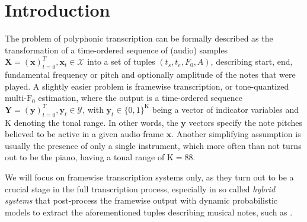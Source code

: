 \section{Introduction}
The problem of polyphonic transcription can be formally described as the transformation of a time-ordered sequence of (audio) samples $\mathbf{X} = (\mathbf{x})_{t=0}^{T}, \mathbf{x}_t \in \mathcal{X}$ into a set of tuples $(t_{s}, t_{e}, F_0, A)$, describing start, end, fundamental frequency or pitch and optionally amplitude of the notes that were played. A slightly easier problem is framewise transcription, or tone-quantized multi-$\mathrm{F}_0$ estimation, where the output is a time-ordered sequence $\mathbf{Y} = (\mathbf{y})_{t=0}^{T}, \mathbf{y}_t \in \mathcal{Y}$, with $\mathbf{y}_t \in \{0, 1\}^{\mathrm{K}}$ being a vector of indicator variables and $\mathrm{K}$ denoting the tonal range. In other words, the $\mathbf{y}$ vectors specify the note pitches believed to be active in a given audio frame $\mathbf{x}$. Another simplifying assumption is usually the presence of only a single instrument, which more often than not turns out to be the piano, having a tonal range of $\mathrm{K} = 88$.

We will focus on framewise transcription systems only, as they turn out to be a crucial stage in the full transcription process, especially in so called \textit{hybrid systems} that post-process the framewise output with dynamic probabilistic models to extract the aforementioned tuples describing musical notes, such as \cite{Sigtia_Benetos_Boulanger_Weyde_Avila_Dixon_2015, Sigtia_Benetos_Dixon_2016}.

